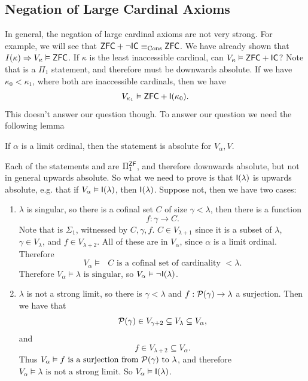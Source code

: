 \documentclass{article}
\begin{document}
\subsection{Negation of Large Cardinal Axioms}
In general, the negation of large cardinal axioms are not very strong. For example, we will see that $\mathsf{ZFC} + \neg \mathsf{IC} \equiv_{\operatorname{Cons}} \mathsf{ZFC}$. We have already shown that $I(\kappa) \Rightarrow V_{\kappa}\vDash \mathsf{ZFC}$. If $\kappa$ is the least inaccessible cardinal, can $V_{\kappa} \vDash \mathsf{ZFC} + \mathsf{IC}$? Note that  is a $\Pi_{1}$ statement, and therefore must be downwards absolute. If we have $\kappa_{0} < \kappa_{1}$, where both are inaccessible cardinals, then we have \[ V_{\kappa_{1}} \vDash \mathsf{ZFC} + \mathsf{I}(\kappa_{0}).\] This doesn't answer our question though. To answer our question we need the following lemma 
\begin{fancylem}{}
    If $\alpha$ is a limit ordinal, then the statement  is absolute for $V_{\alpha}, V$.
\end{fancylem}
\proof \newlec Each of the statements  and  are $\Pi_{1}^{\mathsf{ZF}}$, and therefore downwards absolute, but not in general upwards absolute. So what we need to prove is that $\mathsf{I}(\lambda)$ is upwards absolute, e.g. that if $V_{\alpha} \vDash \mathsf{I}(\lambda)$, then $\mathsf{I}(\lambda)$. Suppose not, then we have two cases: \begin{enumerate}
    \item[Case 1.] $\lambda$ is singular, so there is a cofinal set $C$ of size $\gamma < \lambda$, then there is a function \[ f: \gamma \to C.\] Note that  is $\Sigma_{1}$, witnessed by $C, \gamma, f$. $C \in V_{\lambda+1}$ since it is a subset of $\lambda$, $\gamma \in V_{\lambda}$, and $f \in V_{\lambda+2}$. All of these are in $V_{\alpha}$, since $\alpha$ is a limit ordinal. Therefore \[V_{\alpha} \models \text{ $C$ is a cofinal set of cardinality $< \lambda$}.\] Therefore $V_{\alpha} \models \lambda \text{ is singular}$, so $V_{\alpha} \vDash \neg \mathsf{I}(\lambda)$.
    \item[Case 2.] $\lambda$ is not a strong limit, so there is $\gamma< \lambda$ and $f: \mathcal{P}(\gamma) \to \lambda$ a surjection. Then we have that \[\mathcal{P}(\gamma) \in V_{\gamma+2} \subseteq V_{\lambda} \subseteq V_{\alpha},\]
    and \[ f \in V_{\lambda+2} \subseteq V_{\alpha}.\] Thus $V_{\alpha} \vDash f \text{ is a surjection from $\mathcal{P}(\gamma)$ to $\lambda$}$, and therefore $V_{\alpha} \models \text{$\lambda$ is not a strong limit.}$ So $V_{\alpha} \vDash \mathsf{I}(\lambda)$.
\end{enumerate} 
\end{document}
